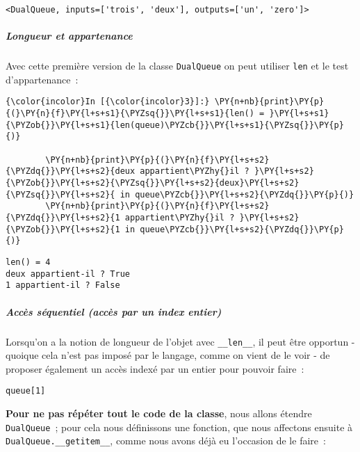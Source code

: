     \begin{Verbatim}[commandchars=\\\{\}]
<DualQueue, inputs=['trois', 'deux'], outputs=['un', 'zero']>

    \end{Verbatim}

    \hypertarget{longueur-et-appartenance}{%
\subparagraph{Longueur et appartenance}\label{longueur-et-appartenance}}

    Avec cette première version de la classe \texttt{DualQueue} on peut
utiliser \texttt{len} et le test d'appartenance~:

    \begin{Verbatim}[commandchars=\\\{\}]
{\color{incolor}In [{\color{incolor}3}]:} \PY{n+nb}{print}\PY{p}{(}\PY{n}{f}\PY{l+s+s1}{\PYZsq{}}\PY{l+s+s1}{len() = }\PY{l+s+s1}{\PYZob{}}\PY{l+s+s1}{len(queue)\PYZcb{}}\PY{l+s+s1}{\PYZsq{}}\PY{p}{)}
        
        \PY{n+nb}{print}\PY{p}{(}\PY{n}{f}\PY{l+s+s2}{\PYZdq{}}\PY{l+s+s2}{deux appartient\PYZhy{}il ? }\PY{l+s+s2}{\PYZob{}}\PY{l+s+s2}{\PYZsq{}}\PY{l+s+s2}{deux}\PY{l+s+s2}{\PYZsq{}}\PY{l+s+s2}{ in queue\PYZcb{}}\PY{l+s+s2}{\PYZdq{}}\PY{p}{)}
        \PY{n+nb}{print}\PY{p}{(}\PY{n}{f}\PY{l+s+s2}{\PYZdq{}}\PY{l+s+s2}{1 appartient\PYZhy{}il ? }\PY{l+s+s2}{\PYZob{}}\PY{l+s+s2}{1 in queue\PYZcb{}}\PY{l+s+s2}{\PYZdq{}}\PY{p}{)}
\end{Verbatim}


    \begin{Verbatim}[commandchars=\\\{\}]
len() = 4
deux appartient-il ? True
1 appartient-il ? False

    \end{Verbatim}

    \hypertarget{accuxe8s-suxe9quentiel-accuxe8s-par-un-index-entier}{%
\subparagraph{Accès séquentiel (accès par un index
entier)}\label{accuxe8s-suxe9quentiel-accuxe8s-par-un-index-entier}}

    Lorsqu'on a la notion de longueur de l'objet avec \texttt{\_\_len\_\_},
il peut être opportun - quoique cela n'est pas imposé par le langage,
comme on vient de le voir - de proposer également un accès indexé par un
entier pour pouvoir faire~:

\begin{verbatim}
queue[1]
\end{verbatim}

\textbf{Pour ne pas répéter tout le code de la classe}, nous allons
étendre \texttt{DualQueue}~; pour cela nous définissons une fonction,
que nous affectons ensuite à \texttt{DualQueue.\_\_getitem\_\_}, comme
nous avons déjà eu l'occasion de le faire~:

